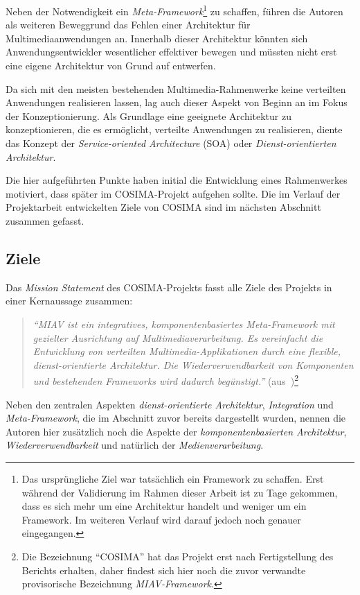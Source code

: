  Neben der Notwendigkeit ein \emph{Meta-Framework}\footnote{Das ursprüngliche Ziel war tatsächlich ein Framework zu schaffen. Erst während der Validierung im Rahmen dieser Arbeit ist zu Tage gekommen, dass es sich mehr um eine Architektur handelt und weniger um ein Framework. Im weiteren Verlauf wird darauf jedoch noch genauer eingegangen.} zu schaffen, führen die Autoren als weiteren Beweggrund das Fehlen einer Architektur für Multimediaanwendungen an. Innerhalb dieser Architektur könnten sich Anwendungsentwickler wesentlicher effektiver bewegen und müssten nicht erst eine eigene Architektur von Grund auf entwerfen.
  
  Da sich mit den meisten bestehenden Multimedia-Rahmenwerke keine verteilten Anwendungen realisieren lassen, lag auch dieser Aspekt von Beginn an im Fokus der Konzeptionierung. Als Grundlage eine geeignete Architektur zu konzeptionieren, die es ermöglicht, verteilte Anwendungen zu realisieren, diente das Konzept der \emph{Service-oriented Architecture} (SOA) oder \emph{Dienst-orientierten Architektur}.
  
  Die hier aufgeführten Punkte haben initial die Entwicklung eines Rahmenwerkes motiviert, dass später im COSIMA-Projekt aufgehen sollte. Die im Verlauf der Projektarbeit entwickelten Ziele von COSIMA sind im nächsten Abschnitt zusammen gefasst.
  
\subsection{Ziele} %
\label{sub:ziele}

  Das \emph{Mission Statement} des COSIMA-Projekts fasst alle Ziele des Projekts in einer Kernaussage zusammen:

  \begin{quote}
    \emph{``MIAV ist ein integratives, komponentenbasiertes Meta-Framework mit gezielter Ausrichtung auf Multimediaverarbeitung. Es vereinfacht die Entwicklung von verteilten Multimedia-Applikationen durch eine flexible, dienst-orientierte Architektur. Die Wiederverwendbarkeit von Komponenten und bestehenden Frameworks wird dadurch begünstigt.''} (aus~\citep[S. 2]{bericht})\footnote{Die Bezeichnung "`COSIMA"' hat das Projekt erst nach Fertigstellung des Berichts erhalten, daher findest sich hier noch die zuvor verwandte provisorische Bezeichnung \emph{MIAV-Framework}.}
  \end{quote}

  Neben den zentralen Aspekten \emph{dienst-orientierte Architektur}, \emph{Integration} und \emph{Meta-Framework}, die im Abschnitt zuvor bereits dargestellt wurden, nennen die Autoren hier zusätzlich noch die Aspekte der \emph{komponentenbasierten Architektur}, \emph{Wiederverwendbarkeit} und natürlich der \emph{Medienverarbeitung}.
  
